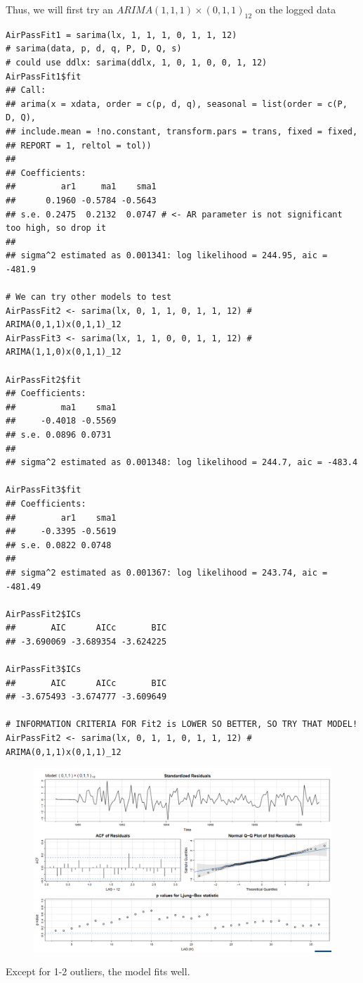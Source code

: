 \documentclass[11pt]{article}
\newcommand{\noi}{\noindent}
\begin{document}
\noi Thus, we will first try an $ARIMA(1,1,1) \times (0,1,1)_{12}$ on the logged data
\begin{lstlisting}
AirPassFit1 = sarima(lx, 1, 1, 1, 0, 1, 1, 12)
# sarima(data, p, d, q, P, D, Q, s)
# could use ddlx: sarima(ddlx, 1, 0, 1, 0, 0, 1, 12)
AirPassFit1$fit
## Call:
## arima(x = xdata, order = c(p, d, q), seasonal = list(order = c(P, D, Q),
## include.mean = !no.constant, transform.pars = trans, fixed = fixed,
## REPORT = 1, reltol = tol))
##
## Coefficients:
##         ar1     ma1    sma1
##      0.1960 -0.5784 -0.5643
## s.e. 0.2475  0.2132  0.0747 # <- AR parameter is not significant too high, so drop it
##
## sigma^2 estimated as 0.001341: log likelihood = 244.95, aic = -481.9

# We can try other models to test
AirPassFit2 <- sarima(lx, 0, 1, 1, 0, 1, 1, 12) # ARIMA(0,1,1)x(0,1,1)_12
AirPassFit3 <- sarima(lx, 1, 1, 0, 0, 1, 1, 12) # ARIMA(1,1,0)x(0,1,1)_12

AirPassFit2$fit
## Coefficients:
##         ma1    sma1
##     -0.4018 -0.5569
## s.e. 0.0896 0.0731
##
## sigma^2 estimated as 0.001348: log likelihood = 244.7, aic = -483.4

AirPassFit3$fit
## Coefficients:
##         ar1    sma1
##     -0.3395 -0.5619
## s.e. 0.0822 0.0748
##
## sigma^2 estimated as 0.001367: log likelihood = 243.74, aic = -481.49

AirPassFit2$ICs
##       AIC      AICc       BIC
## -3.690069 -3.689354 -3.624225

AirPassFit3$ICs
##       AIC      AICc       BIC
## -3.675493 -3.674777 -3.609649

# INFORMATION CRITERIA FOR Fit2 is LOWER SO BETTER, SO TRY THAT MODEL!
AirPassFit2 <- sarima(lx, 0, 1, 1, 0, 1, 1, 12) # ARIMA(0,1,1)x(0,1,1)_12
\end{lstlisting}
\begin{figure}[H]
    \centering
    \includegraphics[width=0.8\linewidth]{Air Passengers Diagnostic Plots Updated Model.png}
\end{figure}
\noi Except for 1-2 outliers, the model fits well.
\end{document}
